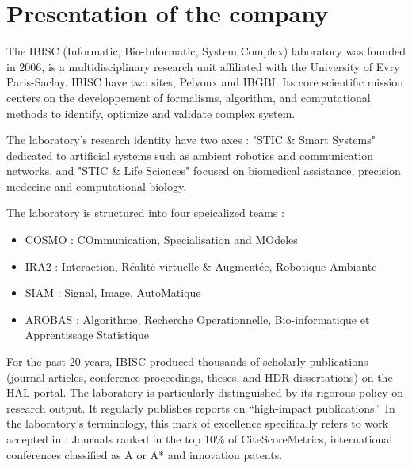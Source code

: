 \documentclass[11pt,a4paper]{article}
\begin{document}
\begin{abstract}
\thispagestyle{plain}
\noindent
Write an abstract here. \\  \\
\textit{Key words}: financial models, machine learning...
\end{abstract}

\newpage
\setcounter{page}{0}
\thispagestyle{plain}
{\hypersetup{linkcolor=black}
\tableofcontents}
\newpage

\setcounter{page}{1}
\section{Presentation of the company}

The IBISC (Informatic, Bio-Informatic, System Complex) laboratory was founded in 2006, is a multidisciplinary research unit affiliated with the University of Evry Paris-Saclay. IBISC have two sites, Pelvoux and IBGBI. Its core scientific mission centers on the developpement of formalisms, algorithm, and computational methods to identify, optimize and validate complex system. 

The laboratory's research identity have two axes : "STIC \& Smart Systems" dedicated to artificial systems sush as ambient robotics and communication networks, and "STIC \& Life Sciences" focused on biomedical assistance, precision medecine and computational biology. 

The laboratory is structured into four speicalized teams : 
\begin{itemize}
    \item COSMO : COmmunication, Specialisation and MOdeles
    \item IRA2 : Interaction, Réalité virtuelle \& Augmentée, Robotique Ambiante
    \item SIAM : Signal, Image, AutoMatique
    \item AROBAS : Algorithme, Recherche Operationnelle, Bio-informatique et Apprentissage Statistique
\end{itemize}

For the past 20 years, IBISC produced thousands of scholarly publications (journal articles, conference proceedings, theses, and HDR dissertations) on the HAL portal. The laboratory is particularly distinguished by its rigorous policy on research output. It regularly publishes reports on “high-impact publications.” In the laboratory’s terminology, this mark of excellence specifically refers to work accepted in : Journals ranked in the top 10\% of CiteScoreMetrics, international conferences classified as A or A* and innovation patents.
\end{document}
